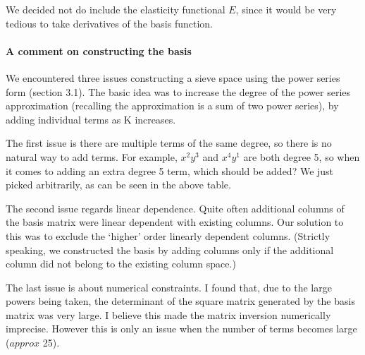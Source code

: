 \documentclass[10pt]{article}
\begin{document}
We decided not do include the elasticity functional $E$, since it
would be very tedious to take derivatives of the basis function.

\paragraph{A comment on constructing the basis}
We encountered three issues constructing a sieve space using the power
series form (section 3.1). The basic idea was to increase the degree
of the power series approximation (recalling the approximation is a
sum of two power series), by adding individual terms as K increases.

The first issue is there are multiple terms of the same degree, so
there is no natural way to add terms. For example, $x^2y^3$ and
$x^4y^1$ are both degree 5, so when it comes to adding an extra degree
5 term, which should be added? We just picked arbitrarily, as can be
seen in the above table.

The second issue regards linear dependence. Quite often additional
columns of the basis matrix were linear dependent with existing
columns. Our solution to this was to exclude the `higher' order linearly
dependent columns. (Strictly speaking, we constructed the basis by
adding columns only if the additional column did not belong to the
existing column space.)

The last issue is about numerical constraints. I found that, due to
the large powers being taken, the determinant of the square matrix
generated by the basis matrix was very large. I believe this made the
matrix inversion numerically imprecise. However this is only an issue
when the number of terms becomes large ($approx$ 25).
\end{document}
